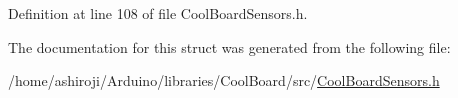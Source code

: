 Definition at line 108 of file Cool\+Board\+Sensors.\+h.



The documentation for this struct was generated from the following file\+:\begin{DoxyCompactItemize}
\item 
/home/ashiroji/\+Arduino/libraries/\+Cool\+Board/src/\hyperlink{_cool_board_sensors_8h}{Cool\+Board\+Sensors.\+h}\end{DoxyCompactItemize}
